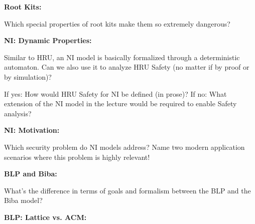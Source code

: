 \documentclass[10pt]{exam}  %
\begin{document}
\begin{questions}
    \question \textbf{Root Kits:}\hfill

    Which special properties of root kits make them so extremely dangerous?
    \begin{solution}
    \end{solution}

    \question \textbf{NI: Dynamic Properties:}\hfill

    Similar to HRU, an NI model is basically formalized through a deterministic automaton. Can we also use it to analyze HRU Safety (no matter if by proof or by simulation)?

    If yes: How would HRU Safety for NI be defined (in prose)? If no: What extension of the NI model in the lecture would be required to enable Safety analysis?
    \begin{solution}
    \end{solution}

    \question \textbf{NI: Motivation:}\hfill

    Which security problem do NI models address? Name two modern application scenarios where this problem is highly relevant!
    \begin{solution}
    \end{solution}

    \question \textbf{BLP and Biba:}\hfill

    What's the difference in terms of goals and formalism between the BLP and the Biba model?
    \begin{solution}
    \end{solution}

    \question \textbf{BLP: Lattice vs. ACM:}\hfill
    \begin{solution}
    \end{solution}


\end{questions}
\end{document}
